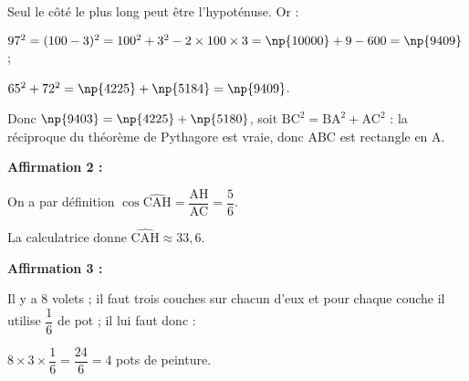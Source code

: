 \documentclass[10pt]{article}
\begin{document}
Seul le côté le plus long peut être l'hypoténuse. Or :

$97^2 = (100 - 3)^2 = 100^2 + 3^2 - 2\times 100 \times 3 = \np{10000} + 9 - 600 = \np{9409}$ ;

$65^2 + 72^2 = \np{4225} + \np{5184} = \np{9409}$.

Donc $\np{9403} = \np{4225} + \np{5180}$, soit $\text{BC}^2 = \text{BA}^2 + \text{AC}^2$ : la réciproque du théorème de Pythagore est  vraie, donc ABC est  rectangle en A.
\medskip

\textbf{Affirmation 2 :} 


%
%
% 
%
%
On a par définition $\cos \widehat{\text{CAH}} = \dfrac{\text{AH}}{\text{AC}} = \dfrac{5}{6}$.

La calculatrice donne $\widehat{\text{CAH}} \approx 33,6$\degres.

\medskip

\textbf{Affirmation 3 : }

%
Il y a 8 volets ; il faut trois couches sur chacun d'eux et pour chaque couche il utilise $\dfrac{1}{6}$ de pot ; il lui faut donc :

$8 \times 3 \times \dfrac{1}{6} = \dfrac{24}{6} = 4$ pots de peinture.

\bigskip
\end{document}
